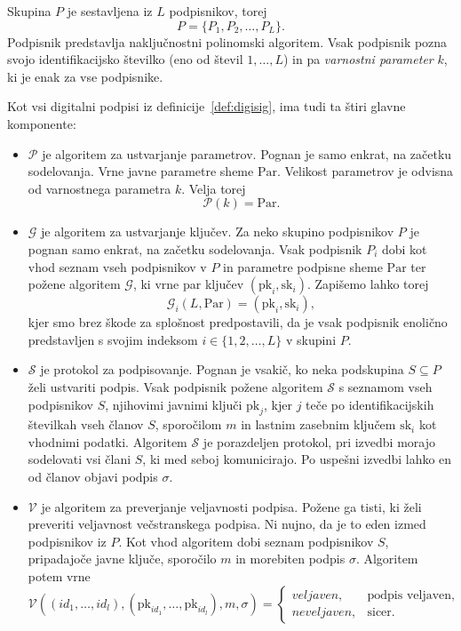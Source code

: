 \begin{definicija}
\label{def:asm}
    Skupina $P$ je sestavljena iz $L$ podpisnikov, torej
    $$
    P = \{P_1, P_2, \dots, P_L \}.
    $$
    Podpisnik predstavlja naključnostni polinomski algoritem. Vsak podpisnik pozna svojo 
    identifikacijsko številko (eno od števil $1, \dots, L$) in pa \textit{varnostni parameter} $k$,
    ki je enak za vse podpisnike.

    Kot vsi digitalni podpisi iz definicije~\ref{def:digisig}, ima tudi ta štiri glavne komponente:
    \begin{itemize}
        \item $\mathcal{P}$ je algoritem za ustvarjanje parametrov. Pognan je samo enkrat, na začetku
            sodelovanja. Vrne javne parametre sheme $\text{Par}$. Velikost parametrov je odvisna od
            varnostnega parametra $k$. Velja torej
            $$
            \mathcal{P}(k) = \text{Par}.
            $$
        \item $\mathcal{G}$ je algoritem za ustvarjanje ključev. Za neko skupino podpisnikov $P$ je pognan samo
            enkrat, na začetku sodelovanja. Vsak podpisnik $P_i$ dobi kot vhod seznam vseh podpisnikov v $P$
            in parametre podpisne sheme $\text{Par}$ ter požene algoritem $\mathcal{G}$, ki vrne par ključev
            $(\text{pk}_i, \text{sk}_i)$. Zapišemo lahko torej
            $$
            \mathcal{G}_i(L, \text{Par}) = (\text{pk}_i, \text{sk}_i),
            $$
            kjer smo brez škode za splošnost predpostavili, da je vsak podpisnik enolično predstavljen
            s svojim indeksom $i \in \{1, 2, \dots, L\}$ v skupini $P$.
        \item $\mathcal{S}$ je protokol za podpisovanje. Pognan je vsakič, ko neka podskupina 
            $S \subseteq P$ želi ustvariti podpis. Vsak podpisnik požene algoritem $\mathcal{S}$ s
            seznamom vseh podpisnikov $S$, njihovimi javnimi ključi $\text{pk}_j$, kjer $j$ teče po
            identifikacijskih številkah vseh članov $S$, sporočilom $m$ in lastnim zasebnim ključem
            $\text{sk}_i$ kot vhodnimi podatki. Algoritem $\mathcal{S}$ je porazdeljen protokol,
            pri izvedbi morajo sodelovati vsi člani $S$, ki med seboj komunicirajo. Po uspešni
            izvedbi lahko en od članov objavi podpis $\sigma$.
        \item $\mathcal{V}$ je algoritem za preverjanje veljavnosti podpisa. Požene ga tisti, ki želi 
            preveriti veljavnost večstranskega podpisa. Ni nujno, da je to eden izmed podpisnikov iz $P$. 
            Kot vhod algoritem dobi seznam podpisnikov $S$, pripadajoče javne ključe, sporočilo $m$ in 
            morebiten podpis $\sigma$. Algoritem potem vrne
            $$ 
            \mathcal{V}((id_1, \dots, id_l), (\text{pk}_{id_1}, \dots, \text{pk}_{id_l}), m, \sigma) = 
            \begin{cases}
                veljaven, & \text{podpis veljaven}, \\
                neveljaven, & \text{sicer}.
            \end{cases}
            $$
    \end{itemize}
\end{definicija}

